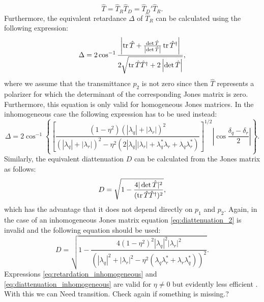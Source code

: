 \begin{equation}
    \hat{T} = \hat{T}_R\hat{T}_D = \hat{T}_D'\hat{T}_R.
\end{equation}
Furthermore, the equivalent retardance $\Delta$ of $\hat{T}_R$ can be calculated using the following expression:
\begin{equation}
    \Delta = 2 \cos^{-1} \frac{\left|\operatorname{tr}\hat{T}+\frac{\det \hat{T}}{\left|\det \hat{T}\right|} \operatorname{tr} \hat{T}^{\dagger}\right|}{2\sqrt{\operatorname{tr} \hat{T}\hat{T}^{\dagger}+2\left|\det \hat{T}\right|}},
\end{equation}
where we assume that the transmittance $p_2$ is not zero since then $\hat{T}$ represents a polarizer for which the determinant of the corresponding Jones matrix is zero. Furthermore, this equation is only valid for homogeneous Jones matrices. In the inhomogeneous case the following expression has to be used instead:
\begin{equation}
    \label{eq:retardation_inhomogeneous}
    \Delta = 2\cos^{-1}\left\{\left[\frac{(1-\eta^2)(|\lambda_q|+|\lambda_r|)^2}
    {(|\lambda_q|+|\lambda_r|)^2-\eta^2(2|\lambda_q||\lambda_r|+\lambda_q^*\lambda_r+\lambda_q\lambda_r^*)}\right]^{1/2}\left|\cos \frac{\delta_q-\delta_r}{2}\right|\right\}.
\end{equation}
Similarly, the equivalent diattenuation $D$ can be calculated from the Jones matrix as follows:
\begin{equation}
    \label{eq:diattenuation_2}
    D=\sqrt{1-\frac{4|\det \hat{T}|^2}{(\operatorname{tr} \hat{T}\hat{T}^{\dagger})^2}},
\end{equation}
which has the advantage that it does not depend directly on $p_1$ and $p_2$. Again, in the case of an inhomogeneous Jones matrix equation \ref{eq:diattenuation_2} is invalid and the following equation should be used:
\begin{equation}
    \label{eq:diattenuation_inhomogeneous}
    D=\sqrt{1- \frac{4(1-\eta^2)^2|\lambda_q|^2|\lambda_r|^2}
    {\left(|\lambda_q|^2+|\lambda_r|^2-\eta^2(\lambda_q\lambda_r^*+\lambda_r\lambda_q^*)\right)^2}}.
\end{equation}
Expressions \ref{eq:retardation_inhomogeneous} and \ref{eq:diattenuation_inhomogeneous} are valid for $\eta \neq 0$ but evidently less efficient \cite{Lu1994HomogeneousMatrices}. With this we can 
Need transition. Check again if something is missing.?

